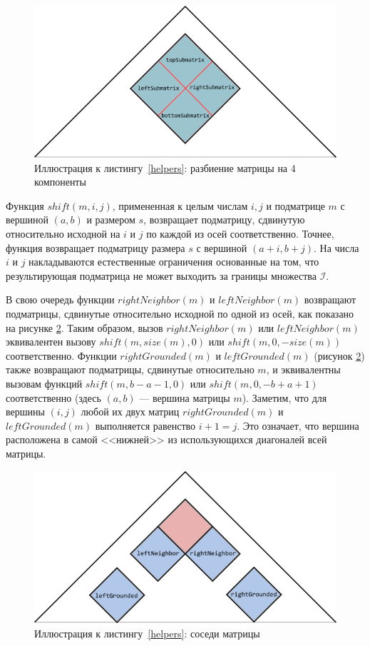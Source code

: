 \documentclass[a4paper,12pt]{article}  %
\theoremstyle{definition}
\theoremstyle{remark}
\begin{document}
\begin{figure}[!h]
  \centering
    \includegraphics[width=0.9\linewidth]{inner.png}
  \caption{Иллюстрация к листингу~\ref{helpers}: разбиение матрицы на 4 компоненты}
  \label{gr:inner}
\end{figure}

Функция $shift(m, i, j)$, примененная к целым числам $i, j$ и подматрице $m$ с вершиной $(a,b)$ и размером $s$, возвращает подматрицу, сдвинутую относительно исходной на $i$ и $j$ по каждой из осей соответственно. Точнее, функция возвращает подматрицу размера $s$ с вершиной $(a+i,b+j)$. На числа $i$ и $j$ накладываются естественные ограничения основанные на том, что результирующая подматрица не может выходить за границы множества $\mathcal{I}$.

В свою очередь функции $rightNeighbor(m)$ и $leftNeighbor(m)$ возвращают подматрицы, сдвинутые относительно исходной по одной из осей, как показано на рисунке \ref{gr:outer}. Таким образом, вызов $rightNeighbor(m)$ или $leftNeighbor(m)$ эквивалентен вызову $shift(m, size(m), 0)$ или \linebreak $shift(m, 0, -size(m))$ соответственно.
Функции $rightGrounded(m)$ и \linebreak $leftGrounded(m)$ (рисунок \ref{gr:outer}) также возвращают подматрицы, сдвинутые относительно $m$, и эквивалентны вызовам функций $shift(m, b-a-1, 0)$ или $shift(m, 0, -b+a+1)$ соответственно (здесь $(a,b)$ --- вершина матрицы $m$).
Заметим, что для вершины $(i,j)$ любой их двух матриц $rightGrounded(m)$ и $leftGrounded(m)$ выполняется равенство $i + 1 = j$. Это означает, что вершина расположена в самой <<нижней>> из использующихся диагоналей всей матрицы. 

\begin{figure}[!ht]
  \centering
    \includegraphics[width=0.9\linewidth]{outer.png}
  \caption{Иллюстрация к листингу~\ref{helpers}: соседи матрицы}
  \label{gr:outer}
\end{figure} 
\end{document}
